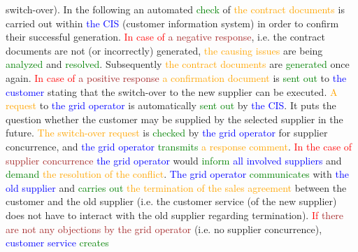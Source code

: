 switch-over). In the following an automated \textcolor{green}{check} of \textcolor{orange}{the} \textcolor{orange}{contract} \textcolor{orange}{documents} is carried out within \textcolor{blue}{the} \textcolor{blue}{CIS} (customer information system) in order to confirm their successful generation. \textcolor{red}{In} \textcolor{red}{case} \textcolor{red}{of} \textcolor{brown}{a} \textcolor{brown}{negative} \textcolor{brown}{response}, i.e. the contract documents are not (or incorrectly) generated, \textcolor{orange}{the} \textcolor{orange}{causing} \textcolor{orange}{issues} are being \textcolor{green}{analyzed} and \textcolor{green}{resolved}. Subsequently \textcolor{orange}{the} \textcolor{orange}{contract} \textcolor{orange}{documents} are \textcolor{green}{generated} once again. \textcolor{red}{In} \textcolor{red}{case} \textcolor{red}{of} \textcolor{brown}{a} \textcolor{brown}{positive} \textcolor{brown}{response} \textcolor{orange}{a} \textcolor{orange}{confirmation} \textcolor{orange}{document} is \textcolor{green}{sent} \textcolor{green}{out} to \textcolor{blue}{the} \textcolor{blue}{customer} stating that the switch-over to the new supplier can be executed. \textcolor{orange}{A} \textcolor{orange}{request} to \textcolor{blue}{the} \textcolor{blue}{grid} \textcolor{blue}{operator} is automatically \textcolor{green}{sent} \textcolor{green}{out} by \textcolor{blue}{the} \textcolor{blue}{CIS}. It puts the question whether the customer may be supplied by the selected supplier in the future. \textcolor{orange}{The} \textcolor{orange}{switch-over} \textcolor{orange}{request} is \textcolor{green}{checked} by \textcolor{blue}{the} \textcolor{blue}{grid} \textcolor{blue}{operator} for supplier concurrence, and \textcolor{blue}{the} \textcolor{blue}{grid} \textcolor{blue}{operator} \textcolor{green}{transmits} \textcolor{orange}{a} \textcolor{orange}{response} \textcolor{orange}{comment}. \textcolor{red}{In} \textcolor{red}{the} \textcolor{red}{case} \textcolor{red}{of} \textcolor{brown}{supplier} \textcolor{brown}{concurrence} \textcolor{blue}{the} \textcolor{blue}{grid} \textcolor{blue}{operator} would \textcolor{green}{inform} \textcolor{blue}{all} \textcolor{blue}{involved} \textcolor{blue}{suppliers} and \textcolor{green}{demand} \textcolor{orange}{the} \textcolor{orange}{resolution} \textcolor{orange}{of} \textcolor{orange}{the} \textcolor{orange}{conflict}. \textcolor{blue}{The} \textcolor{blue}{grid} \textcolor{blue}{operator} \textcolor{green}{communicates} with \textcolor{blue}{the} \textcolor{blue}{old} \textcolor{blue}{supplier} and \textcolor{green}{carries} \textcolor{green}{out} \textcolor{orange}{the} \textcolor{orange}{termination} \textcolor{orange}{of} \textcolor{orange}{the} \textcolor{orange}{sales} \textcolor{orange}{agreement} between the customer and the old supplier (i.e. the customer service (of the new supplier) does not have to interact with the old supplier regarding termination). \textcolor{red}{If} \textcolor{brown}{there} \textcolor{brown}{are} \textcolor{brown}{not} \textcolor{brown}{any} \textcolor{brown}{objections} \textcolor{brown}{by} \textcolor{brown}{the} \textcolor{brown}{grid} \textcolor{brown}{operator} (i.e. no supplier concurrence), \textcolor{blue}{customer} \textcolor{blue}{service} \textcolor{green}{creates} 